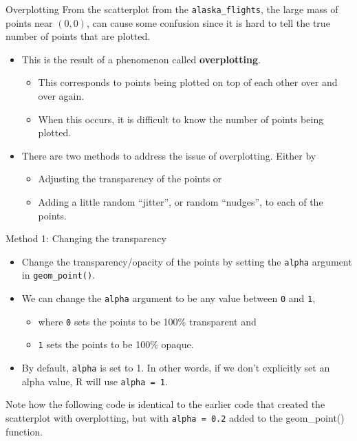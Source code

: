 \documentclass[
  ignorenonframetext,
]{beamer}
\providecommand{\tightlist}{%
  \setlength{\itemsep}{0pt}\setlength{\parskip}{0pt}}
\begin{document}
\begin{frame}[fragile]{Overplotting}
\protect\hypertarget{overplotting}{}
From the scatterplot from the \texttt{alaska\_flights}, the large mass
of points near \((0, 0)\), can cause some confusion since it is hard to
tell the true number of points that are plotted.

\begin{itemize}
\item
  This is the result of a phenomenon called \textbf{overplotting}.

  \begin{itemize}
  \tightlist
  \item
    This corresponds to points being plotted on top of each other over
    and over again.
  \item
    When this occurs, it is difficult to know the number of points being
    plotted.
  \end{itemize}
\item
  There are two methods to address the issue of overplotting. Either by

  \begin{itemize}
  \tightlist
  \item
    Adjusting the transparency of the points or
  \item
    Adding a little random ``jitter'', or random ``nudges'', to each of
    the points.
  \end{itemize}
\end{itemize}
\end{frame}

\begin{frame}[fragile]{Method 1: Changing the transparency}
\protect\hypertarget{method-1-changing-the-transparency}{}
\begin{itemize}
\item
  Change the transparency/opacity of the points by setting the
  \texttt{alpha} argument in \texttt{geom\_point()}.
\item
  We can change the \texttt{alpha} argument to be any value between
  \texttt{0} and \texttt{1},

  \begin{itemize}
  \tightlist
  \item
    where \texttt{0} sets the points to be 100\% transparent and
  \item
    \texttt{1} sets the points to be 100\% opaque.
  \end{itemize}
\item
  By default, \texttt{alpha} is set to 1. In other words, if we don't
  explicitly set an alpha value, R will use \texttt{alpha\ =\ 1}.
\end{itemize}

Note how the following code is identical to the earlier code that
created the scatterplot with overplotting, but with
\texttt{alpha\ =\ 0.2} added to the geom\_point() function.
\end{frame}
\end{document}
